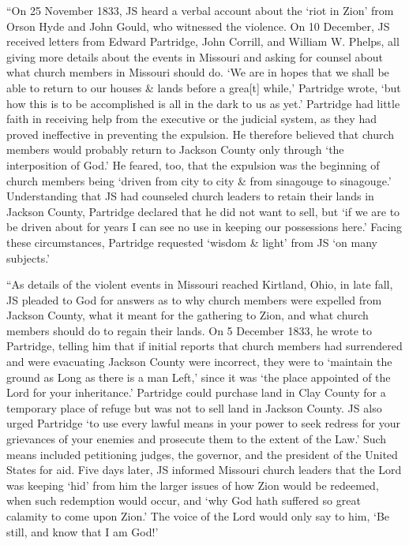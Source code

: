 			``On 25 November 1833, JS heard a verbal account about the `riot in Zion' from Orson Hyde and John Gould, who witnessed the violence. On 10 December, JS received letters from Edward Partridge, John Corrill, and William W. Phelps, all giving more details about the events in Missouri and asking for counsel about what church members in Missouri should do. `We are in hopes that we shall be able to return to our houses \& lands before a grea[t] while,' Partridge wrote, `but how this is to be accomplished is all in the dark to us as yet.' Partridge had little faith in receiving help from the executive or the judicial system, as they had proved ineffective in preventing the expulsion. He therefore believed that church members would probably return to Jackson County only through `the interposition of God.' He feared, too, that the expulsion was the beginning of church members being `driven from city to city \& from sinagouge to sinagouge.' Understanding that JS had counseled church leaders to retain their lands in Jackson County, Partridge declared that he did not want to sell, but `if we are to be driven about for years I can see no use in keeping our possessions here.' Facing these circumstances, Partridge requested `wisdom \& light' from JS `on many subjects.'
			
			``As details of the violent events in Missouri reached Kirtland, Ohio, in late fall, JS pleaded to God for answers as to why church members were expelled from Jackson County, what it meant for the gathering to Zion, and what church members should do to regain their lands. On 5 December 1833, he wrote to Partridge, telling him that if initial reports that church members had surrendered and were evacuating Jackson County were incorrect, they were to `maintain the ground as Long as there is a man Left,' since it was `the place appointed of the Lord for your inheritance.' Partridge could purchase land in Clay County for a temporary place of refuge but was not to sell land in Jackson County. JS also urged Partridge `to use every lawful means in your power to seek redress for your grievances of your enemies and prosecute them to the extent of the Law.' Such means included petitioning judges, the governor, and the president of the United States for aid. Five days later, JS informed Missouri church leaders that the Lord was keeping `hid' from him the larger issues of how Zion would be redeemed, when such redemption would occur, and `why God hath suffered so great calamity to come upon Zion.' The voice of the Lord would only say to him, `Be still, and know that I am God!'
			
